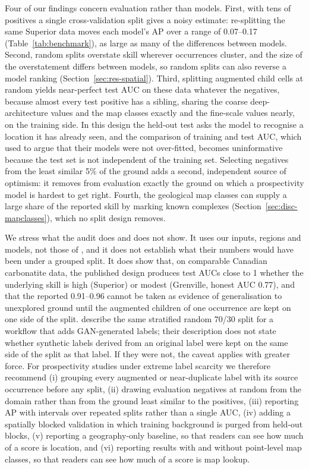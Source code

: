 \documentclass[pdflatex,sn-apa]{sn-jnl}
\begin{document}
Four of our findings concern evaluation rather than models. First, with tens of positives a single cross-validation split gives a noisy estimate: re-splitting the same Superior data moves each model's AP over a range of 0.07--0.17 (Table~\ref{tab:benchmark}), as large as many of the differences between models. Second, random splits overstate skill wherever occurrences cluster, and the size of the overstatement differs between models, so random splits can also reverse a model ranking (Section~\ref{sec:res-spatial}). Third, splitting augmented child cells at random yields near-perfect test AUC on these data whatever the negatives, because almost every test positive has a sibling, sharing the coarse deep-architecture values and the map classes exactly and the fine-scale values nearly, on the training side. In this design the held-out test asks the model to recognise a location it has already seen, and the comparison of training and test AUC, which \citet{Parsa2024} used to argue that their models were not over-fitted, becomes uninformative because the test set is not independent of the training set. Selecting negatives from the least similar 5\% of the ground adds a second, independent source of optimism: it removes from evaluation exactly the ground on which a prospectivity model is hardest to get right. Fourth, the geological map classes can supply a large share of the reported skill by marking known complexes (Section~\ref{sec:disc-mapclasses}), which no split design removes.

We stress what the audit does and does not show. It uses our inputs, regions and models, not those of \citet{Parsa2024}, and it does not establish what their numbers would have been under a grouped split. It does show that, on comparable Canadian carbonatite data, the published design produces test AUCs close to 1 whether the underlying skill is high (Superior) or modest (Grenville, honest AUC 0.77), and that the reported 0.91--0.96 cannot be taken as evidence of generalisation to unexplored ground until the augmented children of one occurrence are kept on one side of the split. \citet{Parsa2025} describe the same stratified random 70/30 split for a workflow that adds GAN-generated labels; their description does not state whether synthetic labels derived from an original label were kept on the same side of the split as that label. If they were not, the caveat applies with greater force. For prospectivity studies under extreme label scarcity we therefore recommend (i) grouping every augmented or near-duplicate label with its source occurrence before any split, (ii) drawing evaluation negatives at random from the domain rather than from the ground least similar to the positives, (iii) reporting AP with intervals over repeated splits rather than a single AUC, (iv) adding a spatially blocked validation in which training background is purged from held-out blocks, (v) reporting a geography-only baseline, so that readers can see how much of a score is location, and (vi) reporting results with and without point-level map classes, so that readers can see how much of a score is map lookup.
\end{document}
